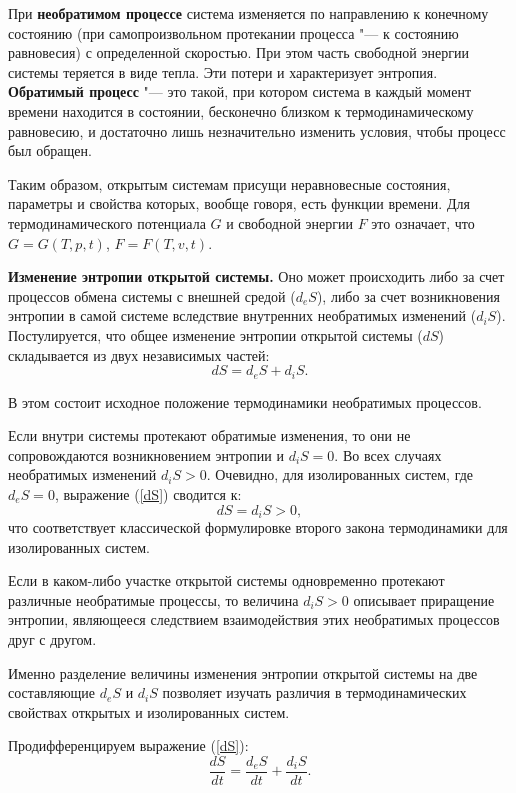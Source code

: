 \documentclass[12pt,a4paper,oneside]{book}
\begin{document}
При \textbf{необратимом процессе} система изменяется по направлению к конечному состоянию (при самопроизвольном протекании процесса "--- к состоянию равновесия) с определенной скоростью. При этом часть свободной энергии системы теряется в виде тепла. Эти потери и характеризует энтропия. \textbf{Обратимый процесс} "--- это такой, при котором система в каждый момент времени находится в состоянии, бесконечно близком к термодинамическому равновесию, и достаточно лишь незначительно изменить условия, чтобы процесс был обращен.

Таким образом, открытым системам присущи неравновесные состояния, параметры и свойства которых, вообще говоря, есть функции времени. Для термодинамического потенциала $G$ и свободной энергии $F$ это означает, что $G = G(T,p,t)$, $F = F(T,v,t)$.

\textbf{Изменение энтропии открытой системы.} Оно может происходить либо за счет процессов обмена системы с внешней средой ($d_eS$), либо за счет возникновения энтропии в самой системе вследствие внутренних необратимых изменений ($d_iS$). Постулируется, что общее изменение энтропии открытой системы ($dS$) складывается из двух независимых частей:
\begin{equation}
	\label{dS}
	dS = d_e S + d_i S.
\end{equation}

В этом состоит исходное положение термодинамики необратимых процессов. 

Если внутри системы протекают обратимые изменения, то они не сопровождаются возникновением энтропии и $d_iS = 0$. Во всех случаях необратимых изменений $d_iS > 0$. Очевидно, для изолированных систем, где $d_eS = 0$, выражение (\ref{dS}) сводится к: 
\begin{equation}
	dS = d_i S > 0,
\end{equation}
что соответствует классической формулировке второго закона термодинамики для изолированных систем.

Если в каком-либо участке открытой системы одновременно протекают различные необратимые процессы, то величина $d_iS > 0$ описывает приращение энтропии, являющееся следствием взаимодействия этих необратимых процессов друг с другом.

Именно разделение величины изменения энтропии открытой системы на две составляющие $d_eS$ и $d_iS$ позволяет изучать различия в термодинамических свойствах открытых и изолированных систем.

Продифференцируем выражение (\ref{dS}): 
\begin{equation}
	\label{dSdt}
	\frac{dS}{dt} = \frac{d_eS}{dt} + \frac{d_iS}{dt}.
\end{equation}
\end{document}
